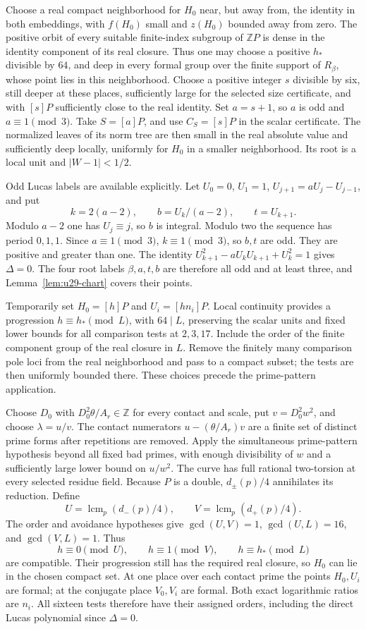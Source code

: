 \documentclass[11pt,a4paper]{article}
\theoremstyle{definition}
\theoremstyle{remark}
\begin{document}
Choose a real compact neighborhood for $H_0$ near, but away from, the
identity in both embeddings, with $f(H_0)$ small and $z(H_0)$ bounded
away from zero.  The positive orbit of every suitable finite-index
subgroup of $\mathbb ZP$ is dense in the identity component of its
real closure.  Thus one may choose a positive $h_*$ divisible by
$64$, and deep in every formal group over the finite support of
$R_\beta$, whose point lies in this neighborhood.  Choose a positive
integer $s$ divisible by six, still deeper at these places, sufficiently large for the selected size certificate, and with $[s]P$ sufficiently close to the real identity.
Set $a=s+1$, so $a$ is odd and $a\equiv1\pmod3$.
Take $S=[a]P$, and use $C_S=[s]P$ in the scalar certificate.
The normalized leaves of its norm tree are then small in the real
absolute value and sufficiently deep locally, uniformly for $H_0$ in
a smaller neighborhood.  Its root is a local unit and
$|W-1|<1/2$.

Odd Lucas labels are available explicitly.  Let
$U_0=0$, $U_1=1$, $U_{j+1}=aU_j-U_{j-1}$, and put
\[
              k=2(a-2),\qquad b=U_k/(a-2),\qquad t=U_{k+1}.
\]
Modulo $a-2$ one has $U_j\equiv j$, so $b$ is integral.
Modulo two the sequence has period $0,1,1$.  Since $a\equiv1\pmod3$,
$k\equiv1\pmod3$, so $b,t$ are odd.  They are positive and greater
than one.  The identity
$U_{k+1}^2-aU_kU_{k+1}+U_k^2=1$ gives $\Delta=0$.
The four root labels $\beta,a,t,b$ are therefore all odd and at least
three, and Lemma~\ref{lem:u29-chart} covers their points.

Temporarily set $H_0=[h]P$ and $U_i=[hn_i]P$.  Local continuity
provides a progression $h\equiv h_*\pmod L$, with $64\mid L$,
preserving the scalar units and fixed lower bounds for all comparison
tests at $2,3,17$.  Include the order of the finite component group
of the real closure in $L$.  Remove the finitely many comparison
pole loci from the real neighborhood and pass to a compact subset;
the tests are then uniformly bounded there.  These choices precede
the prime-pattern application.

Choose $D_0$ with $D_0^2\theta/A_r\in\mathbb Z$ for every contact
and scale, put $v=D_0^2w^2$, and choose $\lambda=u/v$.
The contact numerators $u-(\theta/A_r)v$ are a finite set of distinct
prime forms after repetitions are removed.  Apply the simultaneous
prime-pattern hypothesis beyond all fixed bad primes, with enough
divisibility of $w$ and a sufficiently large lower bound on $u/w^2$.
The curve has full rational two-torsion at every selected residue
field.  Because $P$ is a double, $d_\pm(p)/4$ annihilates its
reduction.  Define
\[
 U=\operatorname{lcm}_p(d_-(p)/4),\qquad
 V=\operatorname{lcm}_p(d_+(p)/4).
\]
The order and avoidance hypotheses give
$\gcd(U,V)=1$, $\gcd(U,L)=16$, and $\gcd(V,L)=1$.
Thus
\[
             h\equiv0\pmod U,\qquad h\equiv1\pmod V,
             \qquad h\equiv h_*\pmod L
\]
are compatible.  Their progression still has the required real
closure, so $H_0$ can lie in the chosen compact set.  At one place over
each contact prime the points $H_0,U_i$ are formal; at the conjugate
place $V_0,V_i$ are formal.  Both exact logarithmic ratios are $n_i$.
All sixteen tests therefore have their assigned orders, including the
direct Lucas polynomial since $\Delta=0$.
\end{document}
